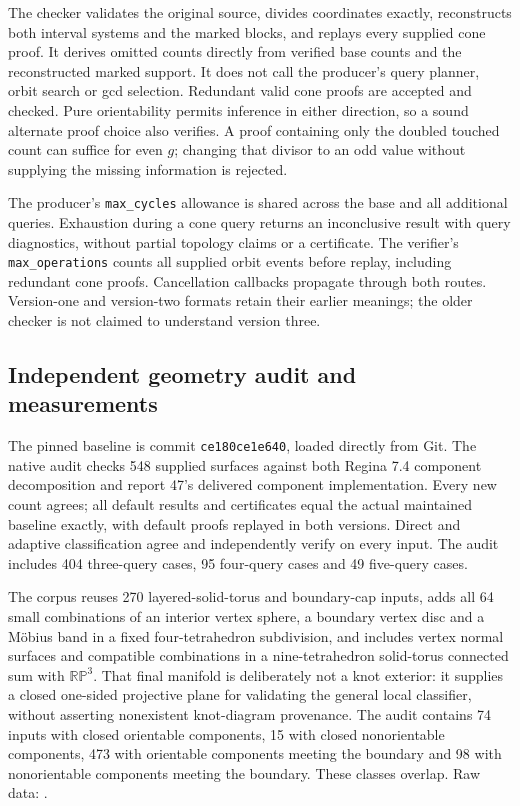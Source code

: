 The checker validates the original source, divides coordinates exactly,
reconstructs both interval systems and the marked blocks, and replays
every supplied cone proof. It derives omitted counts directly from verified
base counts and the reconstructed marked support. It does not call the
producer's query planner, orbit search or gcd selection. Redundant valid
cone proofs are accepted and checked. Pure orientability permits inference
in either direction, so a sound alternate proof choice also verifies.
A proof containing only the doubled touched count can suffice for even
$g$; changing that divisor to an odd value without supplying the missing
information is rejected.

The producer's \texttt{max\_cycles} allowance is shared across the base
and all additional queries. Exhaustion during a cone query returns an
inconclusive result with query diagnostics, without partial topology
claims or a certificate. The verifier's \texttt{max\_operations} counts
all supplied orbit events before replay, including redundant cone proofs.
Cancellation callbacks propagate through both routes. Version-one and
version-two formats retain their earlier meanings; the older checker
is not claimed to understand version three.

\subsection{Independent geometry audit and measurements}

The pinned baseline is commit \texttt{ce180ce1e640}, loaded directly from
Git. The native audit checks 548 supplied surfaces against both Regina 7.4
component decomposition and report 47's delivered component implementation.
Every new count agrees; all default results and certificates equal the
actual maintained baseline exactly, with default proofs replayed in both
versions. Direct and adaptive classification agree and independently
verify on every input. The audit includes 404 three-query cases, 95
four-query cases and 49 five-query cases.

The corpus reuses 270 layered-solid-torus and boundary-cap inputs, adds
all 64 small combinations of an interior vertex sphere, a boundary vertex
disc and a M\"obius band in a fixed four-tetrahedron subdivision, and
includes vertex normal surfaces and compatible combinations in a
nine-tetrahedron solid-torus connected sum with $\mathbb{RP}^3$.
That final manifold is deliberately not a knot exterior: it supplies a
closed one-sided projective plane for validating the general local
classifier, without asserting nonexistent knot-diagram provenance.
The audit contains 74 inputs with closed orientable components, 15 with
closed nonorientable components, 473 with orientable components meeting
the boundary and 98 with nonorientable components meeting the boundary.
These classes overlap. Raw data: .

